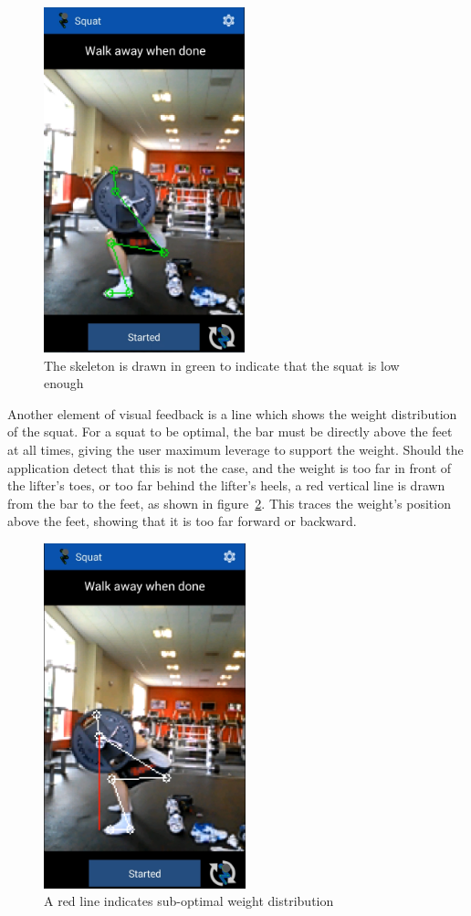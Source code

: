 \begin{figure}[H]
    \centering
	\includegraphics[height=10cm]{application/images/belowparallel}
\caption{The skeleton is drawn in green to indicate that the squat is low enough}
\label{fig:belowparallel}
\end{figure}

Another element of visual feedback is a line which shows the weight distribution of the squat. For a squat to be optimal, the bar must be directly above the feet at all times, giving the user maximum leverage to support the weight. Should the application detect that this is not the case, and the weight is too far in front of the lifter's toes, or too far behind the lifter's heels, a red vertical line is drawn from the bar to the feet, as shown in figure~\ref{fig:weightdistro}. This traces the weight's position above the feet, showing that it is too far forward or backward.

\begin{figure}[H]
    \centering
	\includegraphics[height=10cm]{application/images/weightdistro}
\caption{A red line indicates sub-optimal weight distribution}
\label{fig:weightdistro}
\end{figure}

